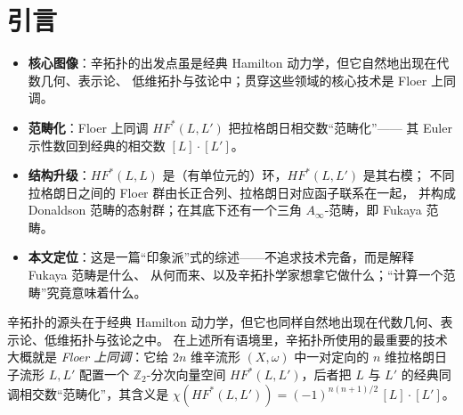 \documentclass[11pt,a4paper]{article}
\numberwithin{equation}{section}
\newcommand{\bZ}{\mathbb{Z}}
\begin{document}
\clearpage



\tableofcontents
\newpage



\section{引言}\label{Sec:Introduction}

\begin{keypoints}
\begin{itemize}
  \item \textbf{核心图像}：辛拓扑的出发点虽是经典 Hamilton 动力学，但它自然地出现在代数几何、表示论、
        低维拓扑与弦论中；贯穿这些领域的核心技术是 Floer 上同调。
  \item \textbf{范畴化}：Floer 上同调 $HF^*(L,L')$ 把拉格朗日相交数“范畴化”——
        其 Euler 示性数回到经典的相交数 $[L]\cdot[L']$。
  \item \textbf{结构升级}：$HF^*(L,L)$ 是（有单位元的）环，$HF^*(L,L')$ 是其右模；
        不同拉格朗日之间的 Floer 群由长正合列、拉格朗日对应函子联系在一起，
        并构成 Donaldson 范畴的态射群；在其底下还有一个三角 $A_\infty$-范畴，即 Fukaya 范畴。
  \item \textbf{本文定位}：这是一篇“印象派”式的综述——不追求技术完备，而是解释 Fukaya 范畴是什么、
        从何而来、以及辛拓扑学家想拿它做什么；“计算一个范畴”究竟意味着什么。
\end{itemize}
\end{keypoints}

辛拓扑的源头在于经典 Hamilton 动力学，但它也同样自然地出现在代数几何、表示论、低维拓扑与弦论之中。
在上述所有语境里，辛拓扑所使用的最重要的技术大概就是 \emph{Floer 上同调}：它给 $2n$ 维辛流形
$(X,\omega)$ 中一对定向的 $n$ 维拉格朗日子流形 $L, L'$ 配置一个 $\bZ_2$-分次向量空间
$HF^*(L,L')$，后者把 $L$ 与 $L'$ 的经典同调相交数“范畴化”，其含义是
$\chi(HF^*(L,L')) = (-1)^{n(n+1)/2}\, [L]\cdot[L']$。
\end{document}

